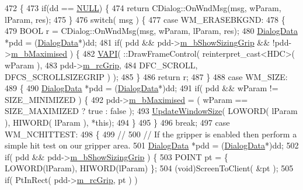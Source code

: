 \begin{DoxyCode}
472 \{
473   \textcolor{keywordflow}{if}(dd == \mbox{\hyperlink{getopt1_8c_a070d2ce7b6bb7e5c05602aa8c308d0c4}{NULL}}) \{
474     \textcolor{keywordflow}{return} CDialog::OnWndMsg(msg, wParam, lParam, res);
475   \}
476   \textcolor{keywordflow}{switch}( msg ) \{
477   \textcolor{keywordflow}{case} WM\_ERASEBKGND:
478     \{
479       BOOL r = CDialog::OnWndMsg(msg, wParam, lParam, res);
480       \mbox{\hyperlink{struct_dialog_data}{DialogData}} *pdd = (\mbox{\hyperlink{struct_dialog_data}{DialogData}}*)dd;
481       \textcolor{keywordflow}{if}( pdd && pdd->\mbox{\hyperlink{struct_dialog_data_aba0ab2f5717e72e528e95a8a1c6a651e}{m\_bShowSizingGrip}} && !pdd->\mbox{\hyperlink{struct_dialog_data_ad1a2c0f029c203945fde9ace5c82c625}{m\_bMaximised}} ) \{
482         \mbox{\hyperlink{_win_helper_8h_a5b2d2a39a00a17407c148a7392e32895}{VAPI}}( ::DrawFrameControl( reinterpret\_cast<HDC>( wParam ),
483                                   pdd->\mbox{\hyperlink{struct_dialog_data_a3d543e5db55fefcd025e18f74558de8d}{m\_rcGrip}},
484                                   DFC\_SCROLL, DFCS\_SCROLLSIZEGRIP ) );
485       \}
486       \textcolor{keywordflow}{return} r;
487     \}
488   \textcolor{keywordflow}{case} WM\_SIZE:
489     \{
490       \mbox{\hyperlink{struct_dialog_data}{DialogData}} *pdd = (\mbox{\hyperlink{struct_dialog_data}{DialogData}}*)dd;
491       \textcolor{keywordflow}{if}( pdd && wParam != SIZE\_MINIMIZED ) \{
492         pdd->\mbox{\hyperlink{struct_dialog_data_ad1a2c0f029c203945fde9ace5c82c625}{m\_bMaximised}} = ( wParam == SIZE\_MAXIMIZED ? true : false );
493         \mbox{\hyperlink{class_resize_dlg_ae2d0d2b44dd32f668c6d9091b14bfc00}{UpdateWindowSize}}( LOWORD( lParam ), HIWORD( lParam ), *\textcolor{keyword}{this});
494       \}
495     \}
496     \textcolor{keywordflow}{break};
497   \textcolor{keywordflow}{case} WM\_NCHITTEST:
498     \{
499       \textcolor{comment}{//}
500       \textcolor{comment}{//        If the gripper is enabled then perform a simple hit test on our gripper area.}
501       \mbox{\hyperlink{struct_dialog_data}{DialogData}} *pdd = (\mbox{\hyperlink{struct_dialog_data}{DialogData}}*)dd;
502       \textcolor{keywordflow}{if}( pdd && pdd->\mbox{\hyperlink{struct_dialog_data_aba0ab2f5717e72e528e95a8a1c6a651e}{m\_bShowSizingGrip}} ) \{
503         POINT pt = \{ LOWORD(lParam), HIWORD(lParam) \};
504         (void)ScreenToClient( &pt );
505         \textcolor{keywordflow}{if}( PtInRect( pdd->\mbox{\hyperlink{struct_dialog_data_a3d543e5db55fefcd025e18f74558de8d}{m\_rcGrip}}, pt ) )

\end{DoxyCode}
